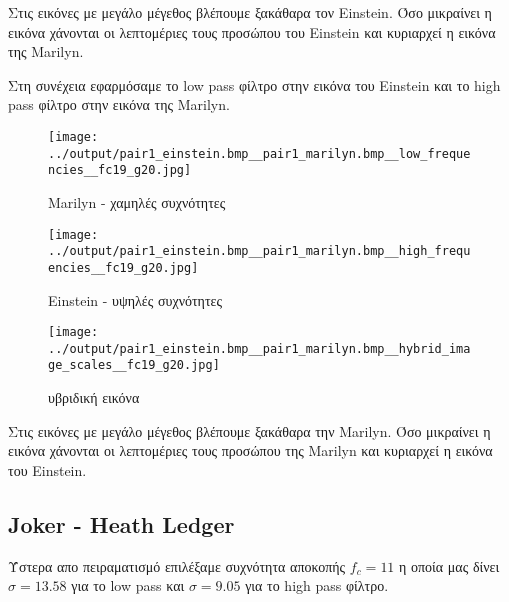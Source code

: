 \documentclass[11pt]{scrartcl} %
\begin{document}
Στις εικόνες με μεγάλο μέγεθος βλέπουμε ξακάθαρα τον Einstein. Όσο μικραίνει η εικόνα χάνονται οι λεπτομέριες τους προσώπου του Einstein και κυριαρχεί η εικόνα της Marilyn.

Στη συνέχεια εφαρμόσαμε το low pass φίλτρο στην εικόνα του Einstein και το high pass φίλτρο στην εικόνα της Marilyn.

\begin{figure}[H]
  \begin{minipage}[c]{8cm}
    \texttt{[image: ../output/pair1\_einstein.bmp\_\_pair1\_marilyn.bmp\_\_low\_frequencies\_\_fc19\_g20.jpg]}
    \caption{Marilyn - χαμηλές συχνότητες}
  \end{minipage}
  \begin{minipage}[c]{8cm}
    \texttt{[image: ../output/pair1\_einstein.bmp\_\_pair1\_marilyn.bmp\_\_high\_frequencies\_\_fc19\_g20.jpg]}
    \caption{Einstein - υψηλές συχνότητες}
  \end{minipage}
\end{figure}

\begin{figure}[H]
  \texttt{[image: ../output/pair1\_einstein.bmp\_\_pair1\_marilyn.bmp\_\_hybrid\_image\_scales\_\_fc19\_g20.jpg]}
  \caption{υβριδική εικόνα}
\end{figure}

Στις εικόνες με μεγάλο μέγεθος βλέπουμε ξακάθαρα την Marilyn. Όσο μικραίνει η εικόνα χάνονται οι λεπτομέριες τους προσώπου της Marilyn και κυριαρχεί η εικόνα του Einstein.

\subsection{Joker - Heath Ledger}

Ύστερα απο πειραματισμό επιλέξαμε συχνότητα αποκοπής $f_c = 11$ η οποία μας δίνει $\sigma = 13.58$ για το low pass και $\sigma = 9.05$ για το high pass φίλτρο.
\end{document}
